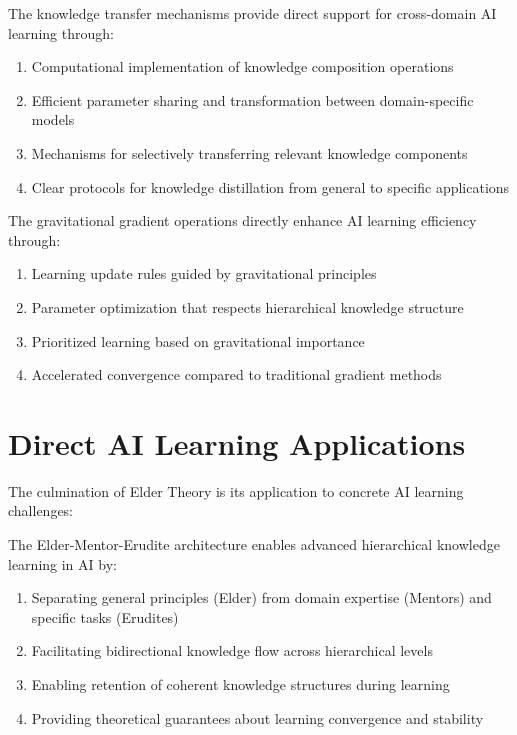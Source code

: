 \begin{theorem}
\label{thm:knowledge_transfer_ai}
The knowledge transfer mechanisms provide direct support for cross-domain AI learning through:
\begin{enumerate}
    \item Computational implementation of knowledge composition operations
    \item Efficient parameter sharing and transformation between domain-specific models
    \item Mechanisms for selectively transferring relevant knowledge components
    \item Clear protocols for knowledge distillation from general to specific applications
\end{enumerate}
\end{theorem}

\begin{theorem}
\label{thm:gradient_operations_ai}
The gravitational gradient operations directly enhance AI learning efficiency through:
\begin{enumerate}
    \item Learning update rules guided by gravitational principles
    \item Parameter optimization that respects hierarchical knowledge structure
    \item Prioritized learning based on gravitational importance
    \item Accelerated convergence compared to traditional gradient methods
\end{enumerate}
\end{theorem}

\section{Direct AI Learning Applications}

The culmination of Elder Theory is its application to concrete AI learning challenges:

\begin{theorem}
\label{thm:hierarchical_learning_ai}
The Elder-Mentor-Erudite architecture enables advanced hierarchical knowledge learning in AI by:
\begin{enumerate}
    \item Separating general principles (Elder) from domain expertise (Mentors) and specific tasks (Erudites)
    \item Facilitating bidirectional knowledge flow across hierarchical levels
    \item Enabling retention of coherent knowledge structures during learning
    \item Providing theoretical guarantees about learning convergence and stability
\end{enumerate}
\end{theorem}

